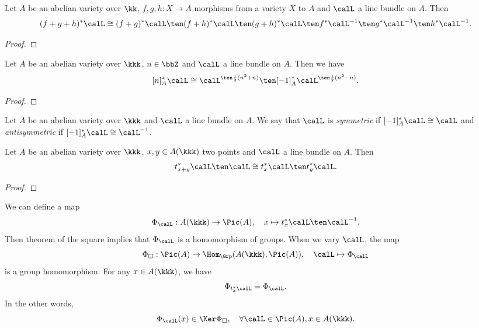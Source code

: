     \begin{proposition}
        Let \(A\) be an abelian variety over \(\kk\), \(f,g,h: X \to A\) morphisms from a variety \(X\) to \(A\) and \(\calL\) a line bundle on \(A\).
        Then 
        \[ (f+g+h)^*\calL \cong (f+g)^*\calL \ten (f+h)^*\calL \ten (g+h)^*\calL \ten f^*\calL^{-1} \ten g^*\calL^{-1} \ten h^*\calL^{-1}. \]
    \end{proposition}
    \begin{proof}
    \end{proof}

    \begin{proposition}\label{prop: pull back of line bundles along the multiplication by n}
        Let \(A\) be an abelian variety over \(\kkk\), \(n\in \bbZ\) and \(\calL\) a line bundle on \(A\). 
        Then we have 
        \[ [n]_A^*\calL \cong \calL^{\ten \frac{1}{2}(n^2+n)} \ten [-1]_A^*\calL^{\ten \frac{1}{2}(n^2-n)}. \]
    \end{proposition}
    \begin{proof}
    \end{proof}

    \begin{definition}\label{def:symmetric_and_antisymmetric_line_bundles}
        Let \(A\) be an abelian variety over \(\kkk\) and \(\calL\) a line bundle on \(A\).
        We say that \(\calL\) is \emph{symmetric} if \([-1]_A^*\calL \cong \calL\) and \emph{antisymmetric} if \([-1]_A^*\calL \cong \calL^{-1}\).
    \end{definition}

    \begin{theorem}\label{thm: theorem of the square}
        Let \(A\) be an abelian variety over \(\kkk\), \(x,y \in A(\kkk)\) two points and \(\calL\) a line bundle on \(A\).
        Then 
        \[ t_{x+y}^*\calL \ten \calL \cong t_x^*\calL \ten t_y^*\calL. \]
    \end{theorem}
    \begin{proof}
    \end{proof}

    \begin{remark}\label{rmk: theorem of the square and homomorphism to Picard group}
        We can define a map
        \[ \Phi_\calL: A(\kkk) \to \Pic(A), \quad x \mapsto t_x^*\calL \ten \calL^{-1}. \]
        Then theorem of the square implies that \(\Phi_\calL\) is a homomorphism of groups.
        When we vary \(\calL\), the map 
        \[ \Phi_{\square}: \Pic(A) \to \Hom_{\Grp}(A(\kkk), \Pic(A)), \quad \calL \mapsto \Phi_\calL \]
        is a group homomorphism.
        For any \(x \in A(\kkk)\), we have
        \[ \Phi_{t_x^*\calL} = \Phi_\calL. \]
        In the other words, 
        \[ \Phi_\calL(x) \in \Ker \Phi_{\square}, \quad \forall \calL \in \Pic(A), x \in A(\kkk). \]
    \end{remark}

